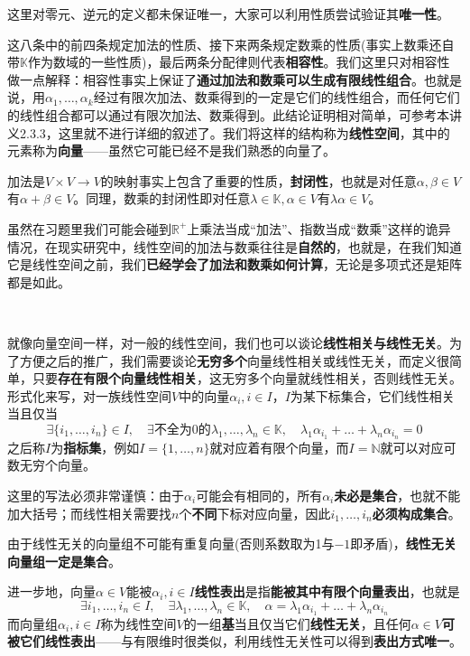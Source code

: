 \documentclass[a4paper,UTF8,fontset=windows,AutoFakeBold]{ctexart}
\newcommand*{\note}{\noindent *}
\begin{document}
\note 这里对零元、逆元的定义都未保证唯一，大家可以利用性质尝试验证其\textbf{唯一性}。

这八条中的前四条规定加法的性质、接下来两条规定数乘的性质(事实上数乘还自带$\mathbb{K}$作为数域的一些性质)，最后两条分配律则代表\textbf{相容性}。我们这里只对相容性做一点解释：相容性事实上保证了\textbf{通过加法和数乘可以生成有限线性组合}。也就是说，用$\alpha_1,\dots,\alpha_k$经过有限次加法、数乘得到的一定是它们的线性组合，而任何它们的线性组合都可以通过有限次加法、数乘得到。此结论证明相对简单，可参考本讲义2.3.3，这里就不进行详细的叙述了。我们将这样的结构称为\textbf{线性空间}，其中的元素称为\textbf{向量}——虽然它可能已经不是我们熟悉的向量了。

\note 加法是$V\times V\to V$的映射事实上包含了重要的性质，\textbf{封闭性}，也就是对任意$\alpha,\beta\in V$有$\alpha+\beta\in V$。同理，数乘的封闭性即对任意$\lambda\in\mathbb{K},\alpha\in V$有$\lambda\alpha\in V$。

\note 虽然在习题里我们可能会碰到$\mathbb{R}^+$上乘法当成``加法''、指数当成``数乘''这样的诡异情况，在现实研究中，线性空间的加法与数乘往往是\textbf{自然的}，也就是，在我们知道它是线性空间之前，我们\textbf{已经学会了加法和数乘如何计算}，无论是多项式还是矩阵都是如此。

\

就像向量空间一样，对一般的线性空间，我们也可以谈论\textbf{线性相关与线性无关}。为了方便之后的推广，我们需要谈论\textbf{无穷多个}向量线性相关或线性无关，而定义很简单，只要\textbf{存在有限个向量线性相关}，这无穷多个向量就线性相关，否则线性无关。形式化来写，对一族线性空间$V$中的向量$\alpha_i,i\in I$，$I$为某下标集合，它们线性相关当且仅当
$$\exists\{i_1,\dots,i_n\}\in I,\quad\exists\text{不全为0的}\lambda_1,\dots,\lambda_n\in\mathbb{K},\quad\lambda_1\alpha_{i_1}+\dots+\lambda_n\alpha_{i_n}=0$$
\note 之后称$I$为\textbf{指标集}，例如$I=\{1,\dots,n\}$就对应着有限个向量，而$I=\mathbb{N}$就可以对应可数无穷个向量。

\note 这里的写法必须非常谨慎：由于$\alpha_i$可能会有相同的，所有$\alpha_i$\textbf{未必是集合}，也就不能加大括号；而线性相关需要找$n$个\textbf{不同}下标对应向量，因此$i_1,\dots,i_n$\textbf{必须构成集合}。

\note 由于线性无关的向量组不可能有重复向量(否则系数取为1与$-1$即矛盾)，\textbf{线性无关向量组一定是集合}。

进一步地，向量$\alpha\in V$能被$\alpha_i,i\in I$\textbf{线性表出}是指\textbf{能被其中有限个向量表出}，也就是
$$\exists i_1,\dots,i_n\in I,\quad\exists\lambda_1,\dots,\lambda_n\in\mathbb{K},\quad\alpha=\lambda_1\alpha_{i_1}+\dots+\lambda_n\alpha_{i_n}$$
而向量组$\alpha_i,i\in I$称为线性空间$V$的一组\textbf{基}当且仅当它们\textbf{线性无关}，且任何$\alpha\in V$\textbf{可被它们线性表出}——与有限维时很类似，利用线性无关性可以得到\textbf{表出方式唯一}。
\end{document}
